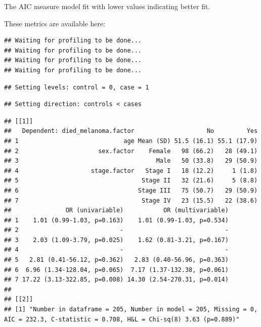 \documentclass[12pt,]{krantz}
\makeatletter
\newenvironment{Shaded}{\begin{snugshade}}{\end{snugshade}}
\newcommand{\DataTypeTok}[1]{\textcolor[rgb]{0.13,0.29,0.53}{#1}}
\newcommand{\KeywordTok}[1]{\textcolor[rgb]{0.13,0.29,0.53}{\textbf{#1}}}
\newcommand{\NormalTok}[1]{#1}
\newcommand{\OperatorTok}[1]{\textcolor[rgb]{0.81,0.36,0.00}{\textbf{#1}}}
\newcommand{\OtherTok}[1]{\textcolor[rgb]{0.56,0.35,0.01}{#1}}
\newcommand{\StringTok}[1]{\textcolor[rgb]{0.31,0.60,0.02}{#1}}
\newenvironment{kframe}{%
\medskip{}
\setlength{\fboxsep}{.8em}
 \def\at@end@of@kframe{}%
 \ifinner\ifhmode%
  \def\at@end@of@kframe{\end{minipage}}%
  \begin{minipage}{\columnwidth}%
 \fi\fi%
 \def\FrameCommand##1{\hskip\@totalleftmargin \hskip-\fboxsep
 \colorbox{shadecolor}{##1}\hskip-\fboxsep
     \hskip-\linewidth \hskip-\@totalleftmargin \hskip\columnwidth}%
 \MakeFramed {\advance\hsize-\width
   \@totalleftmargin\z@ \linewidth\hsize
   \@setminipage}}%
 {\par\unskip\endMakeFramed%
 \at@end@of@kframe}
\renewenvironment{Shaded}{\begin{kframe}}{\end{kframe}}
\theoremstyle{definition}
\theoremstyle{definition}
\theoremstyle{definition}
\theoremstyle{remark}
\makeatother
\begin{document}
The AIC measure model fit with lower values indicating better fit.

These metrics are available here:

\begin{Shaded}
\end{Shaded}

\begin{verbatim}
## Waiting for profiling to be done...
## Waiting for profiling to be done...
## Waiting for profiling to be done...
## Waiting for profiling to be done...
\end{verbatim}

\begin{verbatim}
## Setting levels: control = 0, case = 1
\end{verbatim}

\begin{verbatim}
## Setting direction: controls < cases
\end{verbatim}

\begin{verbatim}
## [[1]]
##   Dependent: died_melanoma.factor                    No         Yes
## 1                             age Mean (SD) 51.5 (16.1) 55.1 (17.9)
## 2                      sex.factor    Female   98 (66.2)   28 (49.1)
## 3                                      Male   50 (33.8)   29 (50.9)
## 4                    stage.factor   Stage I   18 (12.2)     1 (1.8)
## 5                                  Stage II   32 (21.6)     5 (8.8)
## 6                                 Stage III   75 (50.7)   29 (50.9)
## 7                                  Stage IV   23 (15.5)   22 (38.6)
##               OR (univariable)           OR (multivariable)
## 1    1.01 (0.99-1.03, p=0.163)    1.01 (0.99-1.03, p=0.534)
## 2                            -                            -
## 3    2.03 (1.09-3.79, p=0.025)    1.62 (0.81-3.21, p=0.167)
## 4                            -                            -
## 5   2.81 (0.41-56.12, p=0.362)   2.83 (0.40-56.96, p=0.363)
## 6  6.96 (1.34-128.04, p=0.065)  7.17 (1.37-132.38, p=0.061)
## 7 17.22 (3.13-322.85, p=0.008) 14.30 (2.54-270.31, p=0.014)
## 
## [[2]]
## [1] "Number in dataframe = 205, Number in model = 205, Missing = 0, AIC = 232.3, C-statistic = 0.708, H&L = Chi-sq(8) 3.63 (p=0.889)"
\end{verbatim}
\end{document}
